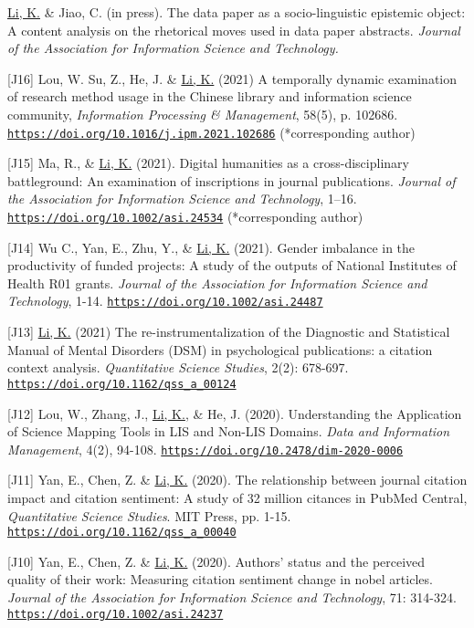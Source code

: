 \documentclass[margin, 10pt]{res} %
\begin{document}
\begin{resume}
[J17] \underline{Li, K.} \& Jiao, C. (in press). The data paper as a socio-linguistic epistemic object: A content analysis on the rhetorical moves used in data paper abstracts. \textit{Journal of the Association for Information Science and Technology.}

[J16] Lou, W. Su, Z., He, J. \& \underline{Li, K.} (2021) A temporally dynamic examination of research method usage in the Chinese library and information science community, \textit{Information Processing \& Management}, 58(5), p. 102686. \href{https://doi.org/10.1016/j.ipm.2021.102686}{\nolinkurl{https://doi.org/10.1016/j.ipm.2021.102686}} (*corresponding author)

[J15] Ma, R., \& \underline{Li, K.} (2021). Digital humanities as a cross-disciplinary battleground: An examination of inscriptions in journal publications. \textit{Journal of the Association for Information Science and Technology}, 1–16. \href{https://doi.org/10.1002/asi.24534}{\nolinkurl{https://doi.org/10.1002/asi.24534}} (*corresponding author)

[J14] Wu C., Yan, E., Zhu, Y., \& \underline{Li, K.} (2021). Gender imbalance in the productivity of funded projects: A study of the outputs of National Institutes of Health R01 grants. \textit{Journal of the Association for Information Science and Technology}, 1-14. \href{https://doi.org/10.1002/asi.24487}{\nolinkurl{https://doi.org/10.1002/asi.24487}}

[J13] \underline{Li, K.} (2021) The re-instrumentalization of the Diagnostic and Statistical Manual of Mental Disorders (DSM) in psychological publications: a citation context analysis. \textit{Quantitative Science Studies}, 2(2): 678-697. \href{https://doi.org/10.1162/qss_a_00124}{\nolinkurl{https://doi.org/10.1162/qss_a_00124}}

[J12] Lou, W., Zhang, J., \underline{Li, K.}, \& He, J. (2020). Understanding the Application of Science Mapping Tools in LIS and Non-LIS Domains. \textit{Data and Information Management}, 4(2), 94-108. \href{https://doi.org/10.2478/dim-2020-0006}{\nolinkurl{https://doi.org/10.2478/dim-2020-0006}}

[J11] Yan, E., Chen, Z. \& \underline{Li, K.} (2020). The relationship between journal citation impact and citation sentiment: A study of 32 million citances in PubMed Central, \textit{Quantitative Science Studies}. MIT Press, pp. 1-15. \href{https://doi.org/10.1162/qss\_a\_00040}{\nolinkurl{https://doi.org/10.1162/qss_a_00040}}

[J10] Yan, E., Chen, Z. \& \underline{Li, K.} (2020). Authors' status and the perceived quality of their work: Measuring citation sentiment change in nobel articles. \textit{Journal of the Association for Information Science and Technology}, 71: 314-324. \href{https://doi.org/10.1002/asi.24237}{\nolinkurl{https://doi.org/10.1002/asi.24237}}


\end{resume}
\end{document}
